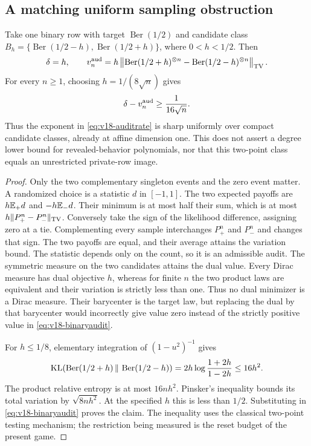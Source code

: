 \subsection{A matching uniform sampling obstruction}
\begin{theorem}
\label{thm:v18-auditlower}
Take one binary row with target $\operatorname{Ber}(1/2)$ and candidate
class $B_h=\{\operatorname{Ber}(1/2-h),\operatorname{Ber}(1/2+h)\}$,
where $0<h<1/2$. Then
\begin{equation}\label{eq:v18-binaryaudit}
 \delta=h,\qquad
 v^{\rm aud}_n=h\left\|\operatorname{Ber}(1/2+h)^{\otimes n}
               -\operatorname{Ber}(1/2-h)^{\otimes n}\right\|_{\rm TV}.
\end{equation}
For every $n\ge1$, choosing $h=1/(8\sqrt n)$ gives
\[
 \delta-v^{\rm aud}_n\ge\frac1{16\sqrt n}.
\]
Thus the exponent in \eqref{eq:v18-auditrate} is sharp uniformly over
compact candidate classes, already at affine dimension one. This does
not assert a degree lower bound for revealed-behavior polynomials, nor
that this two-point class equals an unrestricted private-row image.
\end{theorem}
\begin{proof}
Only the two complementary singleton events and the zero event matter.
A randomized choice is a statistic $d$ in $[-1,1]$. The two expected
payoffs are $h\mathbb E_+d$ and $-h\mathbb E_-d$. Their minimum is at most half their
sum, which is at most $h\|P_+^n-P_-^n\|_{\rm TV}$. Conversely take the
sign of the likelihood difference, assigning zero at a tie. Complementing
every sample interchanges $P_+^n$ and $P_-^n$ and changes that sign.
The two payoffs are equal, and their average attains the variation bound.
The statistic depends only on the count, so it is an admissible audit.
The symmetric measure on the two candidates attains the dual value.
Every Dirac measure has dual objective $h$, whereas for finite $n$ the two
product laws are equivalent and their variation is strictly less than one.
Thus no dual minimizer is a Dirac measure. Their barycenter is the target
law, but replacing the dual by that barycenter would incorrectly give
value zero instead of the strictly positive value in
\eqref{eq:v18-binaryaudit}.

For $h\le1/8$, elementary integration of $(1-u^2)^{-1}$ gives
\[
 \operatorname{KL}(\operatorname{Ber}(1/2+h)\,\|\,\operatorname{Ber}(1/2-h))
 =2h\log\frac{1+2h}{1-2h}\le16h^2.
\]
The product relative entropy is at most $16nh^2$. Pinsker's inequality
bounds its total variation by $\sqrt{8nh^2}$. At the specified $h$ this
is less than $1/2$. Substituting in \eqref{eq:v18-binaryaudit} proves the
claim. The inequality uses the classical two-point testing mechanism;
the restriction being measured is the reset budget of the present game.
\end{proof}

